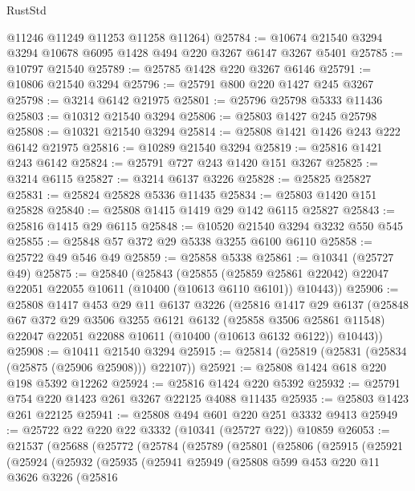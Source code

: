 \begin{lexlean}{RustStd}
\begin{coremodule}
      @11246
      @11249
      @11253
      @11258
      @11264)
@25784 := @10674 @21540 @3294 @3294 @10678 @6095 @1428 @494 @220 @3267 @6147 @3267 @5401
@25785 := @10797 @21540
@25789 := @25785 @1428 @220 @3267 @6146
@25791 := @10806 @21540 @3294
@25796 := @25791 @800 @220 @1427 @245 @3267
@25798 := @3214 @6142 @21975
@25801 := @25796 @25798 @5333 @11436
@25803 := @10312 @21540 @3294
@25806 := @25803 @1427 @245 @25798
@25808 := @10321 @21540 @3294
@25814 := @25808 @1421 @1426 @243 @222 @6142 @21975
@25816 := @10289 @21540 @3294
@25819 := @25816 @1421 @243 @6142
@25824 := @25791 @727 @243 @1420 @151 @3267
@25825 := @3214 @6115
@25827 := @3214 @6137 @3226
@25828 := @25825 @25827
@25831 := @25824 @25828 @5336 @11435
@25834 := @25803 @1420 @151 @25828
@25840 := @25808 @1415 @1419 @29 @142 @6115 @25827
@25843 := @25816 @1415 @29 @6115
@25848 := @10520 @21540 @3294 @3232 @550 @545
@25855 := @25848 @57 @372 @29 @5338 @3255 @6100 @6110
@25858 := @25722 @49 @546 @49
@25859 := @25858 @5338
@25861 := @10341 (@25727 @49)
@25875 := @25840
    (@25843
      (@25855
        (@25859 @25861 @22042)
        @22047
        @22051
        @22055
        @10611
        (@10400 (@10613 @6110 @6101))
        @10443))
@25906 := @25808
    @1417
    @453
    @29
    @11
    @6137
    @3226
    (@25816
      @1417
      @29
      @6137
      (@25848
        @67
        @372
        @29
        @3506
        @3255
        @6121
        @6132
        (@25858 @3506 @25861 @11548)
        @22047
        @22051
        @22088
        @10611
        (@10400 (@10613 @6132 @6122))
        @10443))
@25908 := @10411 @21540 @3294
@25915 := @25814 (@25819 (@25831 (@25834 (@25875 (@25906 @25908))) @22107))
@25921 := @25808 @1424 @618 @220 @198 @5392 @12262
@25924 := @25816 @1424 @220 @5392
@25932 := @25791 @754 @220 @1423 @261 @3267 @22125 @4088 @11435
@25935 := @25803 @1423 @261 @22125
@25941 := @25808 @494 @601 @220 @251 @3332 @9413
@25949 := @25722 @22 @220 @22 @3332 (@10341 (@25727 @22)) @10859
@26053 := @21537
    (@25688
      (@25772
        (@25784
          (@25789
            (@25801
              (@25806
                (@25915
                  (@25921
                    (@25924
                      (@25932
                        (@25935
                          (@25941
                            @25949
                            (@25808
                              @599
                              @453
                              @220
                              @11
                              @3626
                              @3226
                              (@25816

\end{coremodule}
\end{lexlean}
